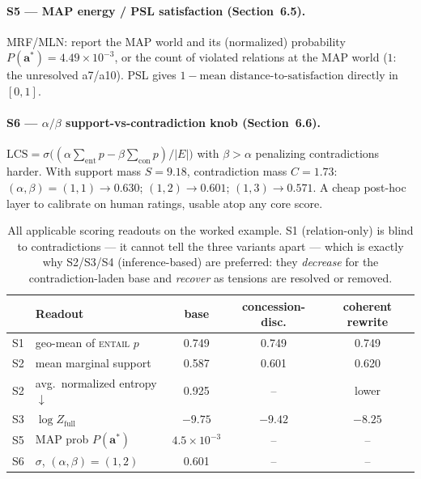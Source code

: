 \documentclass[11pt]{article}
\begin{document}
\paragraph{S5 --- MAP energy / PSL satisfaction (Section~6.5).}
MRF/MLN: report the MAP world and its (normalized) probability $P(\mathbf a^*)=4.49\times
10^{-3}$, or the count of violated relations at the MAP world ($1$: the unresolved a7/a10).
PSL \citep{psl} gives $1-\text{mean distance-to-satisfaction}$ directly in $[0,1]$.

\paragraph{S6 --- $\alpha/\beta$ support-vs-contradiction knob (Section~6.6).}
$\mathrm{LCS}=\sigma\!\big((\alpha\sum_{\text{ent}}p - \beta\sum_{\text{con}}p)/|E|\big)$
with $\beta>\alpha$ penalizing contradictions harder. With support mass $S=9.18$,
contradiction mass $C=1.73$: $(\alpha,\beta)=(1,1)\!\to\!0.630$; $(1,2)\!\to\!0.601$;
$(1,3)\!\to\!0.571$. A cheap post-hoc layer to calibrate on human ratings, usable atop any
core score.

\begin{table}[h]\centering\small
\begin{tabular}{@{}llccc@{}}
\toprule
 & \textbf{Readout} & \textbf{base} & \textbf{concession-disc.} & \textbf{coherent rewrite}\\
\midrule
S1 & geo-mean of \textsc{entail} $p$      & 0.749 & 0.749 & 0.749\\
S2 & mean marginal support               & 0.587 & 0.601 & 0.620\\
S2 & avg.\ normalized entropy $\downarrow$& 0.925 & --    & lower\\
S3 & $\log Z_{\text{full}}$               & $-9.75$ & $-9.42$ & $-8.25$\\
S5 & MAP prob $P(\mathbf a^*)$            & $4.5\!\times\!10^{-3}$ & -- & --\\
S6 & $\sigma$, $(\alpha,\beta)=(1,2)$     & 0.601 & -- & --\\
\bottomrule
\end{tabular}
\caption{All applicable scoring readouts on the worked example. S1 (relation-only) is
blind to contradictions --- it cannot tell the three variants apart --- which is exactly why
S2/S3/S4 (inference-based) are preferred: they \emph{decrease} for the contradiction-laden
base and \emph{recover} as tensions are resolved or removed.}
\label{tab:scores}
\end{table}
\end{document}
